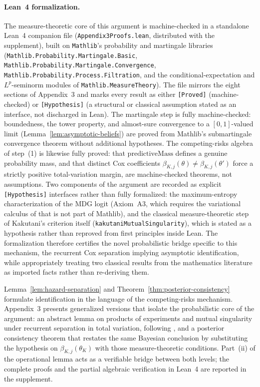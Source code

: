 \documentclass[review,authoryear,12pt]{elsarticle}
\theoremstyle{plain}
\theoremstyle{definition}
\newcommand{\1}{\mathbf{1}}
\begin{document}
\paragraph{Lean~4 formalization.} The measure-theoretic core of this argument is machine-checked in a standalone Lean~4 companion file (\texttt{Appendix3Proofs.lean}, distributed with the supplement), built on \texttt{Mathlib}'s probability and martingale libraries (\texttt{Mathlib.Probability.Martingale.Basic}, \texttt{Mathlib.Probability.Martingale.Convergence}, \texttt{Mathlib.Probability.Process.Filtration}, and the conditional-expectation and $L^p$-seminorm modules of \texttt{Mathlib.MeasureTheory}). The file mirrors the eight sections of Appendix~3 and marks every result as either \texttt{[Proved]} (machine-checked) or \texttt{[Hypothesis]} (a structural or classical assumption stated as an interface, not discharged in Lean). The martingale step is fully machine-checked: boundedness, the tower property, and almost-sure convergence to a $[0,1]$-valued limit (Lemma~\ref{lem:asymptotic-beliefs}) are proved from Mathlib's submartingale convergence theorem without additional hypotheses. The competing-risks algebra of step~(1) is likewise fully proved: that $\mathrm{predictiveMass}$ defines a genuine probability mass, and that distinct Cox coefficients $\beta_{K,j}(\theta)\neq\beta_{K,j}(\theta')$ force a strictly positive total-variation margin, are machine-checked theorems, not assumptions. Two components of the argument are recorded as explicit \texttt{[Hypothesis]} interfaces rather than fully formalized: the maximum-entropy characterization of the MDG logit (Axiom~A3, which requires the variational calculus of \citealt{Jaynes1957Information} that is not part of Mathlib), and the classical measure-theoretic step of Kakutani's criterion itself (\texttt{kakutaniMutualSingularity}), which is stated as a hypothesis rather than reproved from first principles inside Lean. The formalization therefore certifies the novel probabilistic bridge specific to this mechanism, the recurrent Cox separation implying asymptotic identification, while appropriately treating two classical results from the mathematics literature as imported facts rather than re-deriving them.

Lemma~\ref{lem:hazard-separation} and Theorem~\ref{thm:posterior-consistency} formulate identification in the language of the competing-risks mechanism. Appendix~3 presents generalized versions that isolate the probabilistic core of the argument: an abstract lemma on products of experiments and mutual singularity under recurrent separation in total variation, following \citet{Kakutani1948}, and a posterior consistency theorem that restates the same Bayesian conclusion by substituting the hypothesis on $\beta_{K,j}(\theta_K)$ with those measure-theoretic conditions. Part~\textup{(ii)} of the operational lemma acts as a verifiable bridge between both levels; the complete proofs and the partial algebraic verification in Lean~4 are reported in the supplement.
\end{document}
